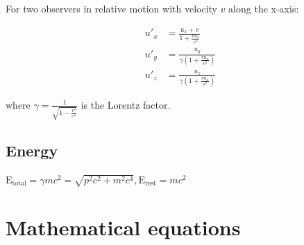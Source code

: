 \documentclass[12pt,a4paper]{article}
\begin{document}
	For two observers in relative motion with velocity \( v \) along the x-axis:
	
	\begin{align}
		u'_{x} &= \frac{u_{x} + v}{1 + \frac{vu_{x}}{c^2}} \\
		u'_{y} &= \frac{u_{y}}{\gamma(1 + \frac{vu_{x}}{c^2})} \\
		u'_{z} &= \frac{u_{z}}{\gamma(1 + \frac{vu_{x}}{c^2})}
	\end{align}
	
	where \( \gamma = \frac{1}{\sqrt{1 - \frac{v^2}{c^2}}} \) is the Lorentz factor.
	
	\subsection*{Energy}
	$\text{E}_\text{total} = \gamma mc^2 = \sqrt{p^2c^2 + m^2c^4}, \text{E}_\text{rest} = mc^2$
	
	
	\section*{Mathematical equations}
\end{document}
